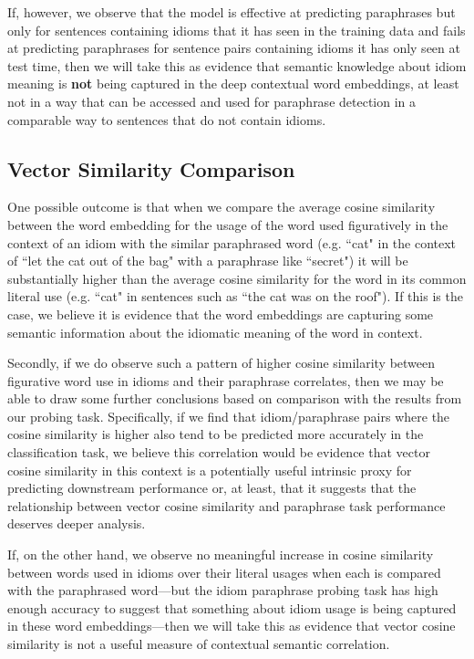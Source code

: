 \documentclass[11pt,a4paper]{article}
\begin{document}
If, however, we observe that the model is effective at predicting paraphrases but only for sentences containing idioms that it has seen in the training data and fails at predicting paraphrases for sentence pairs containing idioms it has only seen at test time, then we will take this as evidence that semantic knowledge about idiom meaning is \textbf{not} being captured in the deep contextual word embeddings, at least not in a way that can be accessed and used for paraphrase detection in a comparable way to sentences that do not contain idioms.


\subsection{Vector Similarity Comparison}
One possible outcome is that when we compare the average cosine similarity between the word embedding for the usage of the word used figuratively in the context of an idiom with the similar paraphrased word (e.g. ``cat" in the context of ``let the cat out of the bag" with a paraphrase like ``secret")  it will be substantially higher than the average cosine similarity for the word in its common literal use (e.g. ``cat" in sentences such as ``the cat was on the roof"). If this is the case, we believe it is evidence that the word embeddings are capturing some semantic information about the idiomatic meaning of the word in context. 

Secondly, if we do observe such a pattern of higher cosine similarity between figurative word use in idioms and their paraphrase correlates, then we may be able to draw some further conclusions based on comparison with the results from our probing task. Specifically, if we find that idiom/paraphrase pairs where the cosine similarity is higher also tend to be predicted more accurately in the classification task, we believe this correlation would be evidence that vector cosine similarity in this context is a potentially useful intrinsic proxy for predicting downstream performance or, at least, that it suggests that the relationship between vector cosine similarity and paraphrase task performance deserves deeper analysis. 

If, on the other hand, we observe no meaningful increase in cosine similarity between words used in idioms over their literal usages when each is compared with the paraphrased word---but the idiom paraphrase probing task has high enough accuracy to suggest that something about idiom usage is being captured in these word embeddings---then we will take this as evidence that vector cosine similarity is not a useful measure of contextual semantic correlation.
\end{document}
